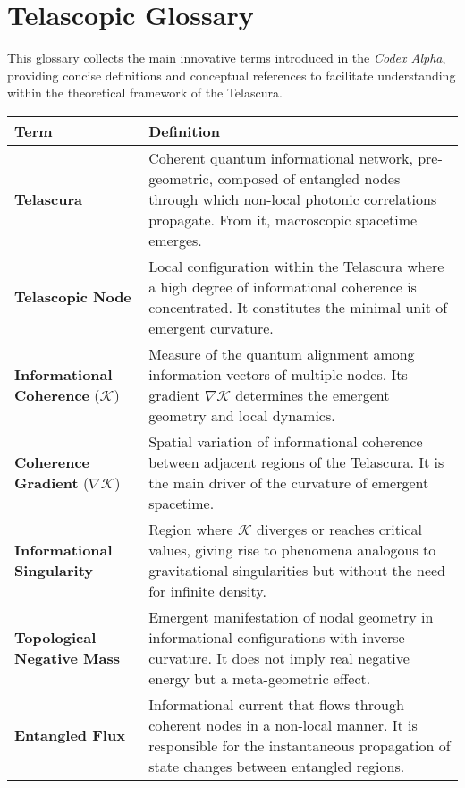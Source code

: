 \documentclass[12pt]{article}
\begin{document}
\clearpage
\section*{Telascopic Glossary}

This glossary collects the main innovative terms introduced in the \textit{Codex Alpha}, providing concise definitions and conceptual references to facilitate understanding within the theoretical framework of the Telascura.

\begin{longtable}{p{4cm} p{11cm}}
\toprule
\textbf{Term} & \textbf{Definition} \\
\midrule
\textbf{Telascura} & Coherent quantum informational network, pre-geometric, composed of entangled nodes through which non-local photonic correlations propagate. From it, macroscopic spacetime emerges. \\

\textbf{Telascopic Node} & Local configuration within the Telascura where a high degree of informational coherence is concentrated. It constitutes the minimal unit of emergent curvature. \\

\textbf{Informational Coherence} ($\mathcal{K}$) & Measure of the quantum alignment among information vectors of multiple nodes. Its gradient $\nabla \mathcal{K}$ determines the emergent geometry and local dynamics. \\

\textbf{Coherence Gradient} ($\nabla \mathcal{K}$) & Spatial variation of informational coherence between adjacent regions of the Telascura. It is the main driver of the curvature of emergent spacetime. \\

\textbf{Informational Singularity} & Region where $\mathcal{K}$ diverges or reaches critical values, giving rise to phenomena analogous to gravitational singularities but without the need for infinite density. \\

\textbf{Topological Negative Mass} & Emergent manifestation of nodal geometry in informational configurations with inverse curvature. It does not imply real negative energy but a meta-geometric effect. \\

\textbf{Entangled Flux} & Informational current that flows through coherent nodes in a non-local manner. It is responsible for the instantaneous propagation of state changes between entangled regions. \\


\end{longtable}
\end{document}
